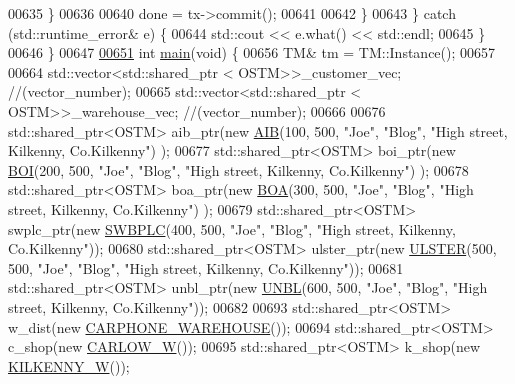 \begin{DoxyCode}
00635             \}
00636 
00640             done = tx->commit();
00641 
00642         \}
00643     \} \textcolor{keywordflow}{catch} (std::runtime\_error& e) \{
00644         std::cout << e.what() << std::endl;
00645     \}
00646 \}
00647 
\hypertarget{main_8cpp_source.tex_l00651}{}\hyperlink{main_8cpp_a840291bc02cba5474a4cb46a9b9566fe}{00651} \textcolor{keywordtype}{int} \hyperlink{main_8cpp_a840291bc02cba5474a4cb46a9b9566fe}{main}(\textcolor{keywordtype}{void}) \{
00656     TM& tm = TM::Instance();
00657 
00664     std::vector<std::shared\_ptr < OSTM>>\_customer\_vec; \textcolor{comment}{//(vector\_number);}
00665     std::vector<std::shared\_ptr < OSTM>>\_warehouse\_vec; \textcolor{comment}{//(vector\_number);}
00666 
00676     std::shared\_ptr<OSTM> aib\_ptr(\textcolor{keyword}{new} \hyperlink{class_a_i_b}{AIB}(100, 500, \textcolor{stringliteral}{"Joe"}, \textcolor{stringliteral}{"Blog"}, \textcolor{stringliteral}{"High street, Kilkenny, Co.Kilkenny"})
      );
00677     std::shared\_ptr<OSTM> boi\_ptr(\textcolor{keyword}{new} \hyperlink{class_b_o_i}{BOI}(200, 500, \textcolor{stringliteral}{"Joe"}, \textcolor{stringliteral}{"Blog"}, \textcolor{stringliteral}{"High street, Kilkenny, Co.Kilkenny"})
      );
00678     std::shared\_ptr<OSTM> boa\_ptr(\textcolor{keyword}{new} \hyperlink{class_b_o_a}{BOA}(300, 500, \textcolor{stringliteral}{"Joe"}, \textcolor{stringliteral}{"Blog"}, \textcolor{stringliteral}{"High street, Kilkenny, Co.Kilkenny"})
      );
00679     std::shared\_ptr<OSTM> swplc\_ptr(\textcolor{keyword}{new} \hyperlink{class_s_w_b_p_l_c}{SWBPLC}(400, 500, \textcolor{stringliteral}{"Joe"}, \textcolor{stringliteral}{"Blog"}, \textcolor{stringliteral}{"High street, Kilkenny,
       Co.Kilkenny"}));
00680     std::shared\_ptr<OSTM> ulster\_ptr(\textcolor{keyword}{new} \hyperlink{class_u_l_s_t_e_r}{ULSTER}(500, 500, \textcolor{stringliteral}{"Joe"}, \textcolor{stringliteral}{"Blog"}, \textcolor{stringliteral}{"High street, Kilkenny,
       Co.Kilkenny"}));
00681     std::shared\_ptr<OSTM> unbl\_ptr(\textcolor{keyword}{new} \hyperlink{class_u_n_b_l}{UNBL}(600, 500, \textcolor{stringliteral}{"Joe"}, \textcolor{stringliteral}{"Blog"}, \textcolor{stringliteral}{"High street, Kilkenny,
       Co.Kilkenny"}));
00682 
00693     std::shared\_ptr<OSTM> w\_dist(\textcolor{keyword}{new} \hyperlink{class_c_a_r_p_h_o_n_e___w_a_r_e_h_o_u_s_e}{CARPHONE\_WAREHOUSE}());
00694     std::shared\_ptr<OSTM> c\_shop(\textcolor{keyword}{new} \hyperlink{class_c_a_r_l_o_w___w}{CARLOW\_W}());
00695     std::shared\_ptr<OSTM> k\_shop(\textcolor{keyword}{new} \hyperlink{class_k_i_l_k_e_n_n_y___w}{KILKENNY\_W}());

\end{DoxyCode}
